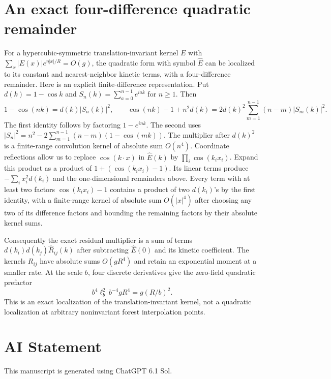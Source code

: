 \documentclass[11pt]{article}
\begin{document}
\section{An exact four-difference quadratic remainder}

For a hypercubic-symmetric translation-invariant kernel \(E\) with
\(\sum_x|E(x)|e^{\eta|x|/R}=O(g)\), the quadratic form with symbol
\(\widehat E\) can be localized to its constant and nearest-neighbor
kinetic terms, with a four-difference remainder. Here is an
explicit finite-difference representation. Put
\(d(k)=1-\cos k\) and \(S_n(k)=\sum_{a=0}^{n-1}e^{iak}\) for
\(n\ge1\). Then
\[
 1-\cos(nk)=d(k)|S_n(k)|^2,\qquad
 \cos(nk)-1+n^2d(k)
   =2d(k)^2\sum_{m=1}^{n-1}(n-m)|S_m(k)|^2 .
\]
The first identity follows by factoring \(1-e^{ink}\). The second
uses \(|S_n|^2=n^2-2\sum_{m=1}^{n-1}(n-m)(1-\cos(mk))\).
The multiplier after \(d(k)^2\) is a finite-range convolution
kernel of absolute sum \(O(n^4)\). Coordinate reflections allow
us to replace \(\cos(k\cdot x)\) in \(\widehat E(k)\) by
\(\prod_i\cos(k_i x_i)\). Expand this product as a product of
\(1+(\cos(k_i x_i)-1)\). Its linear terms produce
\(-\sum_i x_i^2d(k_i)\) and the one-dimensional remainders above.
Every term with at least two factors \(\cos(k_i x_i)-1\)
contains a product of two \(d(k_i)\)'s by the first identity,
with a finite-range kernel of absolute sum \(O(|x|^4)\)
after choosing any two of its difference factors and bounding
the remaining factors by their absolute kernel sums.

Consequently the exact residual multiplier is a sum of
terms \(d(k_i)d(k_j)\widehat R_{ij}(k)\) after subtracting
\(\widehat E(0)\) and its kinetic coefficient. The kernels
\(R_{ij}\) have absolute sums \(O(g R^4)\) and retain an
exponential moment at a smaller rate. At the scale \(b\),
four discrete derivatives give the zero-field quadratic
prefactor
\[
 b^4\ell_b^2\,b^{-4}gR^4=g(R/b)^2 .
\]
This is an exact localization of the translation-invariant
kernel, not a quadratic localization at arbitrary noninvariant
forest interpolation points.


\section*{AI Statement}

This manuscript is generated using ChatGPT 6.1 Sol.
\end{document}
